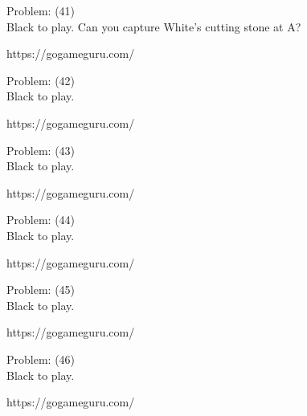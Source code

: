 \documentclass[11pt]{article}
\begin{document}
\begin{minipage}[t]{0.5\textwidth}
  {\centering
  
Problem: (41)\\
Black to play. Can you capture White's cutting stone at A?

https://gogameguru.com/\\
  }
\end{minipage}
\begin{minipage}[t]{0.5\textwidth}
  {\centering
  
Problem: (42)\\
Black to play.

https://gogameguru.com/\\
  }
\end{minipage}
\begin{minipage}[t]{0.5\textwidth}
  {\centering
  
Problem: (43)\\
Black to play.

https://gogameguru.com/\\
  }
\end{minipage}
\begin{minipage}[t]{0.5\textwidth}
  {\centering
  
Problem: (44)\\
Black to play.

https://gogameguru.com/\\
  }
\end{minipage}
\begin{minipage}[t]{0.5\textwidth}
  {\centering
  
Problem: (45)\\
Black to play.

https://gogameguru.com/\\
  }
\end{minipage}
\begin{minipage}[t]{0.5\textwidth}
  {\centering
  
Problem: (46)\\
Black to play.

https://gogameguru.com/\\
  }
\end{minipage}
\end{document}
